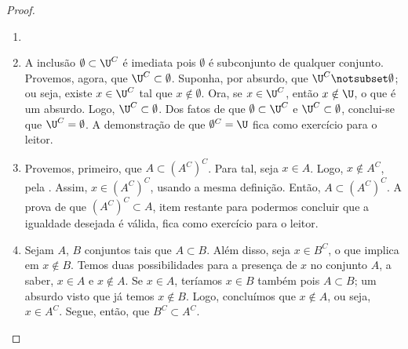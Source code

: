 \begin{proof}
\begin{enumerate}
\item[]
\item
A inclusão $\emptyset \subset \U^C$ é imediata pois $\emptyset$ é subconjunto de qualquer conjunto. 
Provemos, agora, que $\U^C \subset \emptyset$.
Suponha, por absurdo, que $\U^C \notsubset \emptyset$; ou seja, existe $x \in \U^C$ tal que $x \notin \emptyset$.
Ora, se $x \in \U^C$, então $x \notin \U$, o que é um absurdo.
Logo, $\U^C \subset \emptyset$.
Dos fatos de que $\emptyset \subset \U^C$ e $\U^C \subset \emptyset$, conclui-se que $\U^C = \emptyset$.
A demonstração de que $\emptyset^C = \U$ fica como exercício para o leitor.

\item
Provemos, primeiro, que $A \subset (A^C)^C$.
Para tal, seja $x \in A$.
Logo, $x \notin A^C$, pela .
Assim, $x \in (A^C)^C$, usando a mesma definição.
Então, $A \subset (A^C)^C$.
A prova de que $(A^C)^C \subset A$, item restante para podermos concluir que a igualdade desejada é válida, fica como exercício para o leitor.

\item
Sejam $A$, $B$ conjuntos tais que $A \subset B$.
Além disso, seja $x \in B^C$, o que implica em $x \notin B$.
Temos duas possibilidades para a presença de $x$ no conjunto $A$, a saber, $x \in A$ e $x \notin A$.
Se $x \in A$, teríamos $x \in B$ também pois $A \subset B$; um absurdo visto que já temos $x \notin B$.
Logo, concluímos que $x \notin A$, ou seja, $x \in A^C$.
Segue, então, que $B^C \subset A^C$.
\end{enumerate}
\end{proof}


